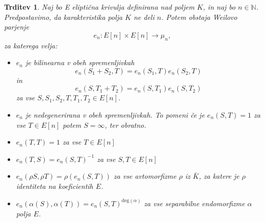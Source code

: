 \documentclass[12pt,a4paper,twoside]{article}
\theoremstyle{definition} %
\theoremstyle{plain} %
\newtheorem{trditev}[definicija]{Trditev}
\numberwithin{equation}{section}  %
\newcommand{\N}{\mathbb N}
\begin{document}
\begin{trditev}
\label{trd-WeilPar}
Naj bo E eliptična krivulja definirana nad poljem $K$, in naj bo $n \in \N$. Predpostavimo, da karakteristika polja $K$ ne deli $n$. Potem obstaja Weilovo parjenje
$$e_n:E[n] \times E[n] \rightarrow \mu_n,$$
za katerega velja:
\begin{itemize}
\item $e_n$ je bilinearna v obeh spremenljivkah
$$e_n(S_1+S_2,T) = e_n(S_1,T)e_n(S_2,T)$$
in
$$e_n(S,T_1+T_2) = e_n(S,T_1)e_n(S,T_2)$$
za vse $S,S_1,S_2,T,T_1,T_2 \in E[n]$.
\item $e_n$ je nedegenerirana v obeh spremenljivkah. To pomeni če je $e_n(S,T) = 1$ za vse $T \in E[n]$ potem $S = \infty$, ter obratno.

\item $e_n(T,T) = 1$ za vse $T \in E[n]$

\item $e_n(T,S) = e_n(S,T)^{-1}$ za vse $S,T \in E[n]$

\item $e_n(\rho S,\rho T) = \rho(e_n(S,T))$ za vse avtomorfizme $\rho$ iz $\bar{K}$, za katere je $\rho$ identiteta na koeficientih $E$.

\item $e_n(\alpha(S),\alpha(T)) = e_n(S,T)^{\text{deg}(\alpha)}$ za vse separabilne endomorfizme $\alpha$ polja $E$.
\end{itemize}

\end{trditev}
\end{document}
